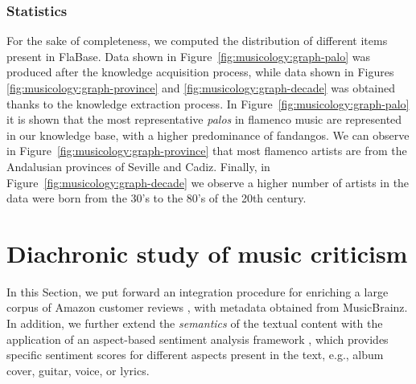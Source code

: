 \subsubsection{Statistics}
\label{sec:musicology:statistics}

For the sake of completeness, we computed the distribution of different items present in FlaBase. 
Data shown in Figure~\ref{fig:musicology:graph-palo} was produced after the knowledge acquisition process, while data shown in Figures \ref{fig:musicology:graph-province} and \ref{fig:musicology:graph-decade} was obtained thanks to the knowledge extraction process. In Figure~\ref{fig:musicology:graph-palo} it is shown that the most representative \textit{palos} in flamenco music are represented in our knowledge base, with a higher predominance of fandangos. We can observe in Figure~\ref{fig:musicology:graph-province} that most flamenco artists are from the Andalusian provinces of Seville and Cadiz. 
Finally, in Figure~\ref{fig:musicology:graph-decade} we observe a higher number of artists in the data were born from the 30's to the 80's of the 20th century.



\section{Diachronic study of music criticism}
\label{sec:musicology:evolution}

In this Section, we put forward an integration procedure for enriching a large corpus of Amazon customer reviews \citep{McAuley2015a,mcauley2015image}, with metadata obtained from MusicBrainz. %
In addition, we further extend the \textit{semantics} of the textual content with the application of an aspect-based sentiment analysis framework \citep{DongSOS13}, which provides specific sentiment scores for different aspects present in the text, e.g., album cover, guitar, voice, or lyrics.

